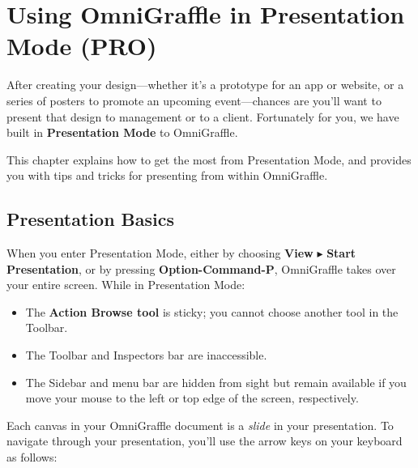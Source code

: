 \documentclass[../main.tex]{subfiles}
\begin{document}
\chapter{Using OmniGraffle in Presentation Mode (\texorpdfstring{\textbf{PRO}}{PRO})}

After creating your design---whether it's a prototype for an app or website, or a series of
posters to promote an upcoming event---chances are you'll want to present that design to
management or to a client. Fortunately for you, we have built in \textbf{Presentation Mode} to
OmniGraffle.

This chapter explains how to get the most from Presentation Mode, and provides you with tips and
tricks for presenting from within OmniGraffle.

\section{Presentation Basics}

When you enter Presentation Mode, either by choosing \textbf{View} $\blacktriangleright$
\textbf{Start Presentation}, or by pressing \textbf{Option-Command-P}, OmniGraffle takes over
your entire screen. While in Presentation Mode:

\begin{itemize}
  \item The \textbf{Action Browse tool}  is
    sticky; you cannot choose another tool in the Toolbar.
  \item The Toolbar and Inspectors bar are inaccessible.
  \item The Sidebar and menu bar are hidden from sight but remain available if you move your
    mouse to the left or top edge of the screen, respectively.
\end{itemize}

Each canvas in your OmniGraffle document is a \textit{slide} in your presentation. To navigate
through your presentation, you'll use the arrow keys on your keyboard as follows:
\end{document}
